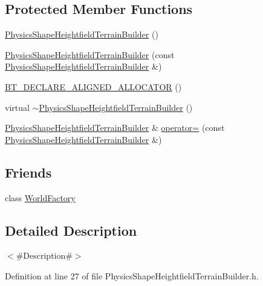 \subsection*{Protected Member Functions}
\begin{DoxyCompactItemize}
\item 
\mbox{\hyperlink{classnjli_1_1_physics_shape_heightfield_terrain_builder_aa8df995b53a3d9c26b810589bf77e935}{Physics\+Shape\+Heightfield\+Terrain\+Builder}} ()
\item 
\mbox{\hyperlink{classnjli_1_1_physics_shape_heightfield_terrain_builder_aaf84975d20884430868df0fbca54e912}{Physics\+Shape\+Heightfield\+Terrain\+Builder}} (const \mbox{\hyperlink{classnjli_1_1_physics_shape_heightfield_terrain_builder}{Physics\+Shape\+Heightfield\+Terrain\+Builder}} \&)
\item 
\mbox{\hyperlink{classnjli_1_1_physics_shape_heightfield_terrain_builder_a5168b2b46aafcc3687bfca6f57022ee5}{B\+T\+\_\+\+D\+E\+C\+L\+A\+R\+E\+\_\+\+A\+L\+I\+G\+N\+E\+D\+\_\+\+A\+L\+L\+O\+C\+A\+T\+OR}} ()
\item 
virtual \mbox{\hyperlink{classnjli_1_1_physics_shape_heightfield_terrain_builder_a8de5e43f3da44c87bc5a38b12e1bc17e}{$\sim$\+Physics\+Shape\+Heightfield\+Terrain\+Builder}} ()
\item 
\mbox{\hyperlink{classnjli_1_1_physics_shape_heightfield_terrain_builder}{Physics\+Shape\+Heightfield\+Terrain\+Builder}} \& \mbox{\hyperlink{classnjli_1_1_physics_shape_heightfield_terrain_builder_a4b32869293f1b723f7bdced4aaab92c1}{operator=}} (const \mbox{\hyperlink{classnjli_1_1_physics_shape_heightfield_terrain_builder}{Physics\+Shape\+Heightfield\+Terrain\+Builder}} \&)
\end{DoxyCompactItemize}
\subsection*{Friends}
\begin{DoxyCompactItemize}
\item 
class \mbox{\hyperlink{classnjli_1_1_physics_shape_heightfield_terrain_builder_acb96ebb09abe8f2a37a915a842babfac}{World\+Factory}}
\end{DoxyCompactItemize}


\subsection{Detailed Description}
$<$\#\+Description\#$>$ 

Definition at line 27 of file Physics\+Shape\+Heightfield\+Terrain\+Builder.\+h.




